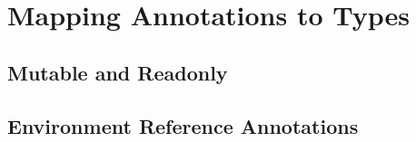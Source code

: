 \section{Mapping Annotations to Types}

\subsection{Mutable and Readonly}

\subsection{Environment Reference Annotations}
